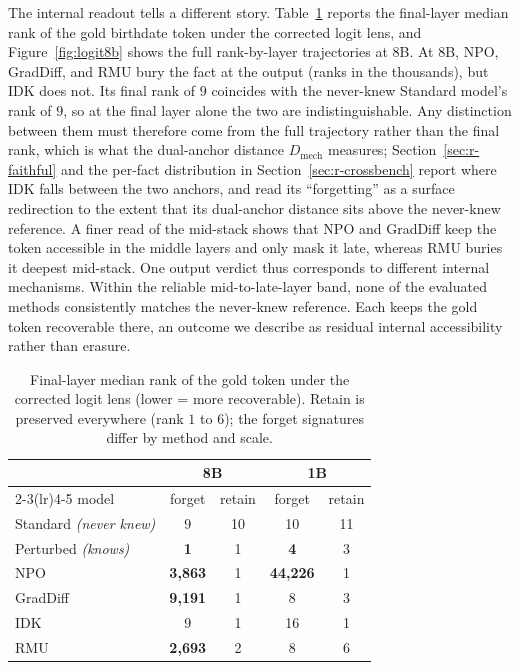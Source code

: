 The internal readout tells a different story. Table~\ref{tab:ranks} reports the final-layer median rank of
the gold birthdate token under the corrected logit lens, and Figure~\ref{fig:logit8b} shows the full
rank-by-layer trajectories at 8B. At 8B, NPO, GradDiff, and RMU bury the fact at the output (ranks in the
thousands), but IDK does not. Its final rank of $9$ coincides with the never-knew Standard model's rank of
$9$, so at the final layer alone the two are indistinguishable. Any distinction between them must therefore
come from the full trajectory rather than the final rank, which is what the dual-anchor distance
$D_\text{mech}$ measures; Section~\ref{sec:r-faithful} and the per-fact distribution in
Section~\ref{sec:r-crossbench} report where IDK falls between the two anchors, and read its ``forgetting''
as a surface redirection to the extent that its dual-anchor distance sits above the never-knew reference. A
finer read of the mid-stack shows that NPO and GradDiff keep the token accessible in the middle layers and
only mask it late, whereas RMU buries it deepest mid-stack. One output verdict thus corresponds to different
internal mechanisms. Within the reliable mid-to-late-layer band, none of the evaluated methods consistently
matches the never-knew reference. Each keeps the gold token recoverable there, an outcome we describe as
residual internal accessibility rather than erasure.

\begin{table}[t]
  \centering
  \caption[Final-layer rank of the gold token]{Final-layer median rank of the gold token under the corrected logit lens (lower = more
  recoverable). Retain is preserved everywhere (rank $1$ to $6$); the forget signatures differ by method and
  scale.}
  \label{tab:ranks}
  \begin{tabular}{lcccc}
    \toprule
    & \multicolumn{2}{c}{\textbf{8B}} & \multicolumn{2}{c}{\textbf{1B}} \\
    \cmidrule(lr){2-3}\cmidrule(lr){4-5}
    model & forget & retain & forget & retain \\
    \midrule
    Standard \emph{(never knew)} & 9 & 10 & 10 & 11 \\
    Perturbed \emph{(knows)}     & \textbf{1} & 1 & \textbf{4} & 3 \\
    NPO      & \textbf{3{,}863} & 1 & \textbf{44{,}226} & 1 \\
    GradDiff & \textbf{9{,}191} & 1 & 8 & 3 \\
    IDK      & 9 & 1 & 16 & 1 \\
    RMU      & \textbf{2{,}693} & 2 & 8 & 6 \\
    \bottomrule
  \end{tabular}
\end{table}

